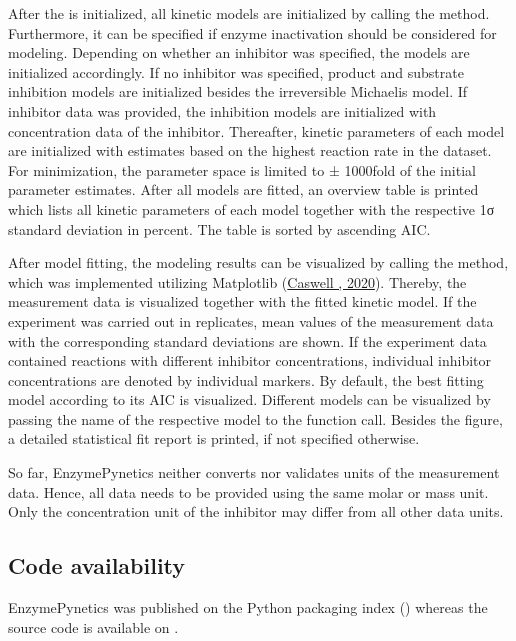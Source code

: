 \documentclass[letterpaper,12pt,english]{jupyterBook}
\begin{document}
After the  is initialized, all kinetic models are initialized by calling the  method. Furthermore, it can be specified if enzyme inactivation should be considered for modeling. Depending on whether an inhibitor was specified, the models are initialized accordingly. If no inhibitor was specified, product and substrate inhibition models are initialized besides the irreversible Michaelis model. If inhibitor data was provided, the inhibition models are initialized with concentration data of the inhibitor. Thereafter, kinetic parameters of each model are initialized with estimates based on the highest reaction rate in the dataset. For minimization, the parameter space is limited to ± 1000\sphinxhyphen{}fold of the initial parameter estimates. After all models are fitted, an overview table is printed which lists all kinetic parameters of each model together with the respective 1σ standard deviation in percent. The table is sorted by ascending AIC.

\sphinxAtStartPar
{}

After model fitting, the modeling results can be visualized by calling the  method, which was implemented utilizing Matplotlib (\hyperlink{cite.references:id36}{Caswell , 2020}).
Thereby, the measurement data is visualized together with the fitted kinetic model. If the experiment was carried out in replicates, mean values of the measurement data with the corresponding standard deviations are shown. If the experiment data contained reactions with different inhibitor concentrations, individual inhibitor concentrations are denoted by individual markers. By default, the best fitting model according to its AIC is visualized. Different models can be visualized by passing the name of the respective model to the function call. Besides the figure, a detailed statistical fit report is printed, if not specified otherwise.

\sphinxAtStartPar
{}

So far, EnzymePynetics neither converts nor validates units of the measurement data. Hence, all data needs to be provided using the same molar or mass unit. Only the concentration unit of the inhibitor may differ from all other data units.


\subsection{Code availability}
\label{\detokenize{methods:id6}}
\sphinxAtStartPar
EnzymePynetics was published on the Python packaging index () whereas the source code is available on .
\end{document}
